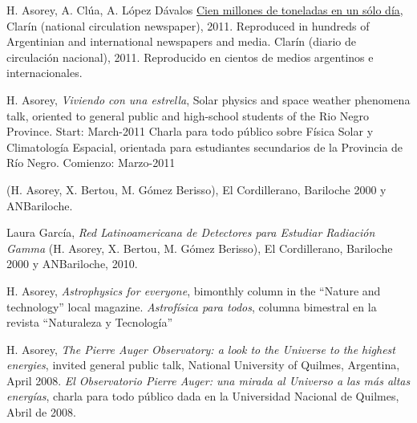 H. Asorey, A. Clúa, A. López Dávalos \href{http://www.clarin.com/sociedad/Cien-millones-toneladas-cenizas-solo_0_517148395.html}{Cien millones de toneladas en un sólo día}, 
\ifeng
Clarín (national circulation newspaper), 2011. Reproduced in hundreds of Argentinian and international newspapers and media.
\else
Clarín (diario de circulación nacional), 2011. Reproducido en cientos de medios argentinos e internacionales.
\fi

H. Asorey, {\emph{Viviendo con una estrella}}, 
\ifeng 
Solar physics and space weather phenomena talk, oriented to general public and high-school students of the Rio Negro Province. Start: March-2011
\else
Charla para todo público sobre Física Solar y Climatología Espacial, orientada para estudiantes secundarios de la Provincia de Río Negro. Comienzo: Marzo-2011
\fi

 (H. Asorey, X. Bertou, M. Gómez Berisso), El Cordillerano, Bariloche 2000 y ANBariloche.

Laura García, {\emph{Red Latinoamericana de Detectores para Estudiar Radiación Gamma}} (H. Asorey, X. Bertou, M. Gómez Berisso), El Cordillerano, Bariloche 2000 y ANBariloche, 2010.

H. Asorey, 
\ifeng
{\emph{Astrophysics for everyone}}, bimonthly column in the ``Nature and technology'' local magazine. \else
{\emph{Astrofísica para todos}}, columna bimestral en la revista ``Naturaleza y Tecnología''
\fi

H. Asorey, 
\ifeng
{\emph{The Pierre Auger Observatory: a look to the Universe to the highest energies}}, invited general public talk, National University of Quilmes, Argentina, April 2008.
\else
{\emph{El Observatorio Pierre Auger: una mirada al Universo a las más altas energías}}, charla para todo público dada en la Universidad Nacional de Quilmes, Abril de 2008.
\fi
